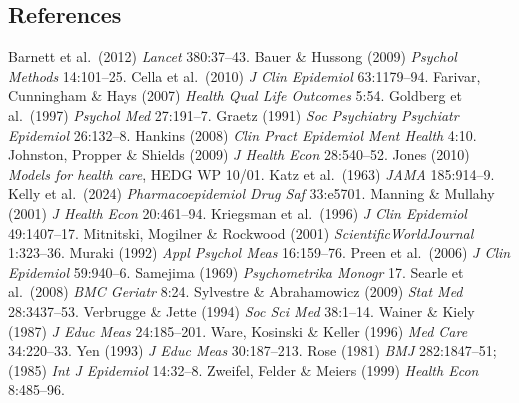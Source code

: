 \documentclass[11pt]{article}
\begin{document}
\subsection*{References}
{\small
Barnett et al.\ (2012) \emph{Lancet} 380:37--43.
Bauer \& Hussong (2009) \emph{Psychol Methods} 14:101--25.
Cella et al.\ (2010) \emph{J Clin Epidemiol} 63:1179--94.
Farivar, Cunningham \& Hays (2007) \emph{Health Qual Life Outcomes} 5:54.
Goldberg et al.\ (1997) \emph{Psychol Med} 27:191--7.
Graetz (1991) \emph{Soc Psychiatry Psychiatr Epidemiol} 26:132--8.
Hankins (2008) \emph{Clin Pract Epidemiol Ment Health} 4:10.
Johnston, Propper \& Shields (2009) \emph{J Health Econ} 28:540--52.
Jones (2010) \emph{Models for health care}, HEDG WP 10/01.
Katz et al.\ (1963) \emph{JAMA} 185:914--9.
Kelly et al.\ (2024) \emph{Pharmacoepidemiol Drug Saf} 33:e5701.
Manning \& Mullahy (2001) \emph{J Health Econ} 20:461--94.
Kriegsman et al.\ (1996) \emph{J Clin Epidemiol} 49:1407--17.
Mitnitski, Mogilner \& Rockwood (2001) \emph{ScientificWorldJournal} 1:323--36.
Muraki (1992) \emph{Appl Psychol Meas} 16:159--76.
Preen et al.\ (2006) \emph{J Clin Epidemiol} 59:940--6.
Samejima (1969) \emph{Psychometrika Monogr} 17.
Searle et al.\ (2008) \emph{BMC Geriatr} 8:24.
Sylvestre \& Abrahamowicz (2009) \emph{Stat Med} 28:3437--53.
Verbrugge \& Jette (1994) \emph{Soc Sci Med} 38:1--14.
Wainer \& Kiely (1987) \emph{J Educ Meas} 24:185--201.
Ware, Kosinski \& Keller (1996) \emph{Med Care} 34:220--33.
Yen (1993) \emph{J Educ Meas} 30:187--213.
Rose (1981) \emph{BMJ} 282:1847--51; (1985) \emph{Int J Epidemiol} 14:32--8.
Zweifel, Felder \& Meiers (1999) \emph{Health Econ} 8:485--96.
}
\end{document}
